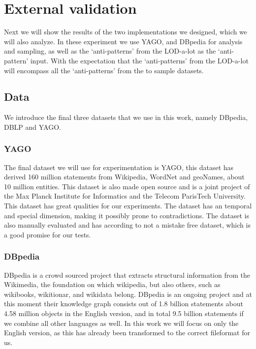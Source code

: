 \documentclass[11pt,letterpaper ,oneside ]{book}
\begin{document}
\newpage
\chapter{External validation}
Next we will show the results of the two implementations we designed, which we will also analyze. In these experiment we use YAGO, and DBpedia for analysis and sampling, as well as the `anti-patterns' from the LOD-a-lot as the `anti-pattern' input. With the expectation that the `anti-patterns' from the LOD-a-lot will encompass all the `anti-patterns' from the to sample datasets.\\

\section{Data}
We introduce the final three datasets that we use in this work, namely DBpedia, DBLP and YAGO.

\subsection{YAGO}
The final dataset we will use for experimentation is YAGO\cite{YAGO2:2013}, this dataset has derived 160 million statements from Wikipedia, WordNet and geoNames, about 10 million entities. This dataset is also made open source and is a joint project of the Max Planck Institute for Informatics and the Telecom ParisTech University. This dataset has great qualities for our experiments. The dataset has an temporal and special dimension, making it possibly prone to contradictions. The dataset is also manually evaluated and has according to \cite{YAGO2:2013} not a mistake free dataset, which is a good promise for our tests.

\subsection{DBpedia}
DBpedia\cite{DBpedia} is a crowd sourced project that extracts structural information from the Wikimedia, the foundation on which wikipedia, but also others, such as wikibooks, wikitionar, and wikidata belong. DBpedia is an ongoing project and at this moment their knowledge graph consists out of 1.8 billion statements about 4.58 million objects in the English version, and in total 9.5 billion statements if we combine all other languages as well. In this work we will focus on only the English version, as this has already been transformed to the correct fileformat for us. 
\end{document}
